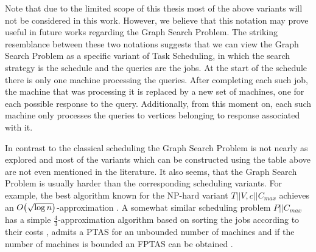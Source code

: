 Note that due to the limited scope of this thesis most of the above variants will not be considered in this work. However, we believe that this notation may prove useful in future works regarding the Graph Search Problem.
The striking resemblance between these two notations suggests that we can view the Graph Search Problem as a specific variant of Task Scheduling, in which the search strategy is the schedule and the queries are the jobs. At the start of the schedule there is only one machine processing the queries. After completing each such job, the machine that was processing it is replaced by a new set of machines, one for each possible response to the query. Additionally, from this moment on, each such machine only processes the queries to vertices belonging to response associated with it.

In contrast to the classical scheduling the Graph Search Problem is not nearly as explored and most of the variants which can be constructed using the table above are not even mentioned in the literature. It also seems, that the Graph Search Problem is usually harder than the corresponding scheduling variants. For example, the best algorithm known for the NP-hard variant $T||V, c||C_{max}$ achieves an $O\mathopen{}\left( \sqrt{\log n} \right)$-approximation \cite{dereniowski2017ApproxSsForGeneralBSinWTs}. A somewhat similar scheduling problem $P||C_{max}$ has a simple $\frac{4}{3}$-approximation algorithm based on sorting the jobs according to their costs \cite{BoundsonMultiprocessingTimingAnomalies}, admits a PTAS for an unbounded number of machines \cite{Binpackingwithrestrictedpiecesizes} and if the number of machines is bounded an FPTAS can be obtained \cite{AlgorithmsforSchedulingIndependentTasks}.
